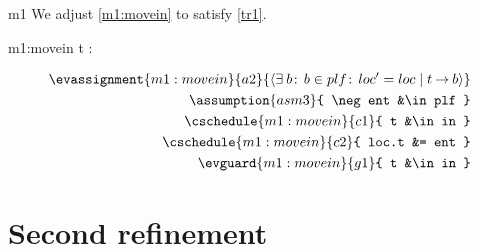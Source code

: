 \documentclass[12pt]{amsart}
\begin{document}
\begin{machine}{m1}
We adjust \ref{m1:movein} to satisfy \ref{tr1}.


\begin{indices}{m1:movein}
	t : \Train
\end{indices}

\begin{align*}
\evassignment{m1:movein}{a2}
	{ \qexists{b}{b \in plf }{ loc' = loc \1| t \tfun b } }
\\ \assumption{asm3}
	{ \neg ent &\in plf }
\\ \cschedule{m1:movein}{c1}{ t &\in in } 
\\ \cschedule{m1:movein}{c2}{ loc.t &= ent }
\\ \evguard{m1:movein}{g1}{ t &\in in }
\end{align*}
%
\end{machine}

\section{Second refinement}
\end{document}
